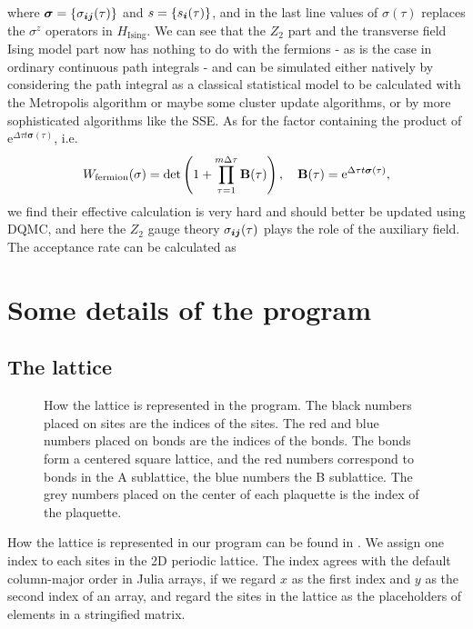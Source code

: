 \documentclass[hyperref, a4paper]{article}
\newcommand*{\ee}{\mathrm{e}}
\newcommand*{\Ztwo}{$\mathbb{Z}_2$ }
\newcommand*{\tfim}{transverse field Ising model}
\def\mathbb#1{#1}%
\begin{document}
where $\bm{\sigma} = \{\sigma_{\vb*{i} \vb*{j}}(\tau)\}$ and $s = \{s_{\vb*{i}}(\tau)\}$, 
and in the last line values of $\sigma(\tau)$ replaces the $\sigma^z$ operators in $H_\text{Ising}$.
We can see that the \Ztwo part and the \tfim{} part now has nothing to do with the fermions - as is the case in ordinary continuous path integrals - and can be simulated either natively by considering the path integral as a classical statistical model to be calculated with the Metropolis algorithm or maybe some cluster update algorithms, or by more sophisticated algorithms like the SSE.
As for the factor containing the product of $\ee^{\Delta\tau t \bm{\sigma}(\tau)}$, i.e. 
\begin{equation}
    W_\text{fermion}(\sigma) = \det \left(1 + \prod_{\tau = 1}^{m\Delta \tau} \vb{B}(\tau) \right), \quad \vb{B}(\tau) =  \ee^{\Delta \tau t \bm{\sigma}(\tau)},
\end{equation}
we find their effective calculation is very hard and should better be updated using DQMC, and here the \Ztwo gauge theory $\sigma_{\vb*{i} \vb*{j}}(\tau)$ plays the role of the auxiliary field.
The acceptance rate can be calculated as 

\section{Some details of the program}

\subsection{The lattice}

\begin{figure}
    
    \caption{How the lattice is represented in the program. 
    The black numbers placed on sites are the indices of the sites.
    The red and blue numbers placed on bonds are the indices of the bonds. The bonds form a centered square lattice, and the red numbers correspond to bonds in the A sublattice, the blue numbers the B sublattice.
    The grey numbers placed on the center of each plaquette is the index of the plaquette.}
    \label{fig:label-representation}
\end{figure}

How the lattice is represented in our program can be found in .
We assign one index to each sites in the 2D periodic lattice.
The index agrees with the default column-major order in Julia arrays, if we regard $x$ as the first index and $y$ as the second index of an array, and regard the sites in the lattice as the placeholders of elements in a stringified matrix.
\end{document}
